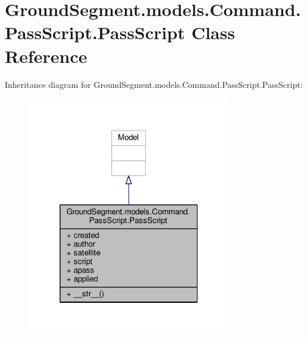\hypertarget{class_ground_segment_1_1models_1_1_command_1_1_pass_script_1_1_pass_script}{}\section{Ground\+Segment.\+models.\+Command.\+Pass\+Script.\+Pass\+Script Class Reference}
\label{class_ground_segment_1_1models_1_1_command_1_1_pass_script_1_1_pass_script}


Inheritance diagram for Ground\+Segment.\+models.\+Command.\+Pass\+Script.\+Pass\+Script\+:\nopagebreak
\begin{figure}[H]
\begin{center}
\leavevmode
\includegraphics[width=253pt]{class_ground_segment_1_1models_1_1_command_1_1_pass_script_1_1_pass_script__inherit__graph}
\end{center}
\end{figure}


